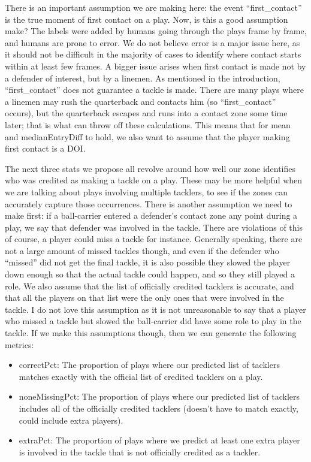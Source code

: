 \documentclass[
  12pt]{article}
\providecommand{\tightlist}{%
  \setlength{\itemsep}{0pt}\setlength{\parskip}{0pt}}\usepackage{longtable,booktabs,array}
\begin{document}
There is an important assumption we are making here: the event
``first\_contact'' is the true moment of first contact on a play. Now,
is this a good assumption make? The labels were added by humans going
through the plays frame by frame, and humans are prone to error. We do
not believe error is a major issue here, as it should not be difficult
in the majority of cases to identify where contact starts within at
least few frames. A bigger issue arises when first contact is made not
by a defender of interest, but by a linemen. As mentioned in the
introduction, ``first\_contact'' does not guarantee a tackle is made.
There are many plays where a linemen may rush the quarterback and
contacts him (so ``first\_contact'' occurs), but the quarterback escapes
and runs into a contact zone some time later; that is what can throw off
these calculations. This means that for mean and medianEntryDiff to
hold, we also want to assume that the player making first contact is a
DOI.

The next three stats we propose all revolve around how well our zone
identifies who was credited as making a tackle on a play. These may be
more helpful when we are talking about plays involving multiple
tacklers, to see if the zones can accurately capture those occurrences.
There is another assumption we need to make first: if a ball-carrier
entered a defender's contact zone any point during a play, we say that
defender was involved in the tackle. There are violations of this of
course, a player could miss a tackle for instance. Generally speaking,
there are not a large amount of missed tackles though, and even if the
defender who ``missed'' did not get the final tackle, it is also
possible they slowed the player down enough so that the actual tackle
could happen, and so they still played a role. We also assume that the
list of officially credited tacklers is accurate, and that all the
players on that list were the only ones that were involved in the
tackle. I do not love this assumption as it is not unreasonable to say
that a player who missed a tackle but slowed the ball-carrier did have
some role to play in the tackle. If we make this assumptions though,
then we can generate the following metrics:

\begin{itemize}
\tightlist
\item
  correctPct: The proportion of plays where our predicted list of
  tacklers matches exactly with the official list of credited tacklers
  on a play.
\item
  noneMissingPct: The proportion of plays where our predicted list of
  tacklers includes all of the officially credited tacklers (doesn't
  have to match exactly, could include extra players).
\item
  extraPct: The proportion of plays where we predict at least one extra
  player is involved in the tackle that is not officially credited as a
  tackler.
\end{itemize}
\end{document}
